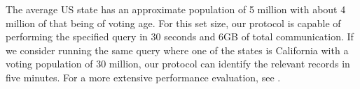 The average US state has an approximate population of 5 million with about 4 million of that being of voting age. For this set size, our protocol is capable of performing the specified query in 30 seconds and 6GB of total communication. If we consider running the same query where one of the states is California with a voting population of 30 million, our protocol can identify the relevant records in five minutes. For a more extensive performance evaluation, see .


